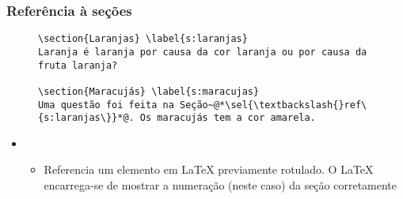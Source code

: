 \begin{frame}[fragile] \frametitle{Referência à seções}
\begin{figure}[!t]
\begin{lstlisting}
\section{Laranjas} \label{s:laranjas}
Laranja é laranja por causa da cor laranja ou por causa da fruta laranja?

\section{Maracujás} \label{s:maracujas}
Uma questão foi feita na Seção~@*\sel{\textbackslash{}ref\{s:laranjas\}}*@. Os maracujás tem a cor amarela.
\end{lstlisting}
\end{figure}

\begin{itemize}
	\item {}
	\begin{itemize}
		\item Referencia um elemento em LaTeX previamente rotulado. O LaTeX encarrega-se de mostrar a numeração (neste caso) da seção corretamente
	\end{itemize}
\end{itemize}
\end{frame}